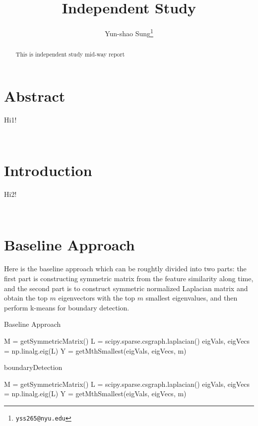 \documentclass[final]{siamltexmm}
\title{Independent Study}
\author{Yun-shao Sung\thanks{\tt yss265@nyu.edu} }
\begin{document}
\maketitle

\begin{abstract}
This is independent study mid-way report
\end{abstract}

\pagestyle{myheadings}
\thispagestyle{plain}

\section{Abstract}
Hi1!

\\
\section{Introduction}
Hi2!

\\
\section{Baseline Approach}
Here is the baseline approach which can be roughtly divided into two parts: the first part is constructing symmetric matrix from the feature similarity along time, and the second part is to construct symmetric normalized Laplacian matrix and obtain the top $m$ eigenvectors with the top $m$ smallest eigenvalues, and then perform k-means for boundary detection.

\begin{algorithm}[htb]
  \caption{Baseline Approach}
  \label{algo:SC}
\begin{algorithmic}[1]
  \STATE M = getSymmetricMatrix()
  \STATE L = scipy.sparse.csgraph.laplacian()
  \STATE eigVals, eigVecs = np.linalg.eig(L)
  \STATE Y = getMthSmallest(eigVals, eigVecs, m)
\end{algorithmic}
\end{algorithm}

\begin{algorithm}[htb]
  \caption{boundaryDetection}

  \label{algo:SC}
\begin{algorithmic}[1]
  \STATE M = getSymmetricMatrix()
  \STATE L = scipy.sparse.csgraph.laplacian()
  \STATE eigVals, eigVecs = np.linalg.eig(L)
  \STATE Y = getMthSmallest(eigVals, eigVecs, m)
\end{algorithmic}
\end{algorithm}
\end{document}
